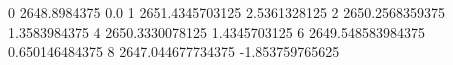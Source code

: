 0 2648.8984375 0.0
1 2651.4345703125 2.5361328125
2 2650.2568359375 1.3583984375
4 2650.3330078125 1.4345703125
6 2649.548583984375 0.650146484375
8 2647.044677734375 -1.853759765625

